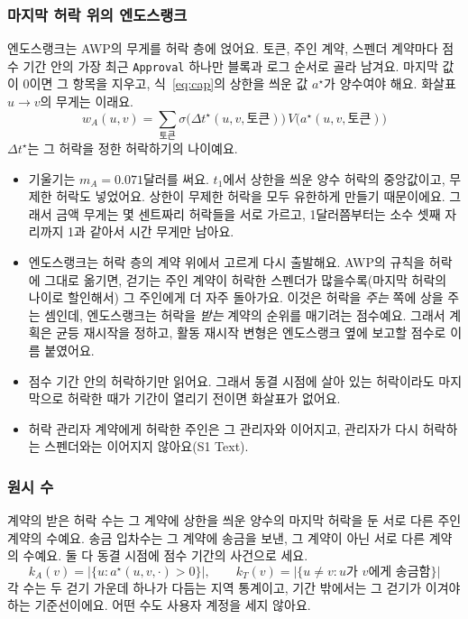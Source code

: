\subsubsection{마지막 허락 위의 엔도스랭크}

엔도스랭크는 AWP의 무게를 허락 층에 얹어요. 토큰, 주인 계약, 스펜더 계약마다 점수 기간 안의 가장 최근 \texttt{Approval} 하나만 블록과 로그 순서로 골라 남겨요. 마지막 값이 0이면 그 항목을 지우고, 식~\eqref{eq:cap}의 상한을 씌운 값 $a^{\star}$가 양수여야 해요. 화살표 $u\to v$의 무게는 이래요.
\begin{equation}
\label{eq:er-weight}
w_A(u,v)=\sum_{\text{토큰}}\sigma\bigl(\Delta t^{\star}(u,v,\text{토큰})\bigr)\,V\bigl(a^{\star}(u,v,\text{토큰})\bigr)
\end{equation}
$\Delta t^{\star}$는 그 허락을 정한 허락하기의 나이예요.
\begin{itemize}
\item 기울기는 $m_A=0.071$달러를 써요. $t_1$에서 상한을 씌운 양수 허락의 중앙값이고, 무제한 허락도 넣었어요. 상한이 무제한 허락을 모두 유한하게 만들기 때문이에요. 그래서 금액 무게는 몇 센트짜리 허락들을 서로 가르고, 1달러쯤부터는 소수 셋째 자리까지 1과 같아서 시간 무게만 남아요.
\item 엔도스랭크는 허락 층의 계약 위에서 고르게 다시 출발해요. AWP의 규칙을 허락에 그대로 옮기면, 걷기는 주인 계약이 허락한 스펜더가 많을수록(마지막 허락의 나이로 할인해서) 그 주인에게 더 자주 돌아가요. 이것은 허락을 \emph{주는} 쪽에 상을 주는 셈인데, 엔도스랭크는 허락을 \emph{받는} 계약의 순위를 매기려는 점수예요. 그래서 계획은 균등 재시작을 정하고, 활동 재시작 변형은 엔도스랭크 옆에 보고할 점수로 이름 붙였어요.
\item 점수 기간 안의 허락하기만 읽어요. 그래서 동결 시점에 살아 있는 허락이라도 마지막으로 허락한 때가 기간이 열리기 전이면 화살표가 없어요.
\item 허락 관리자 계약에게 허락한 주인은 그 관리자와 이어지고, 관리자가 다시 허락하는 스펜더와는 이어지지 않아요(S1 Text).
\end{itemize}

\subsubsection{원시 수}

계약의 받은 허락 수는 그 계약에 상한을 씌운 양수의 마지막 허락을 둔 서로 다른 주인 계약의 수예요. 송금 입차수는 그 계약에 송금을 보낸, 그 계약이 아닌 서로 다른 계약의 수예요. 둘 다 동결 시점에 점수 기간의 사건으로 세요.
\begin{equation}
\label{eq:degrees}
k_A(v)=\bigl|\{u : a^{\star}(u,v,\cdot)>0\}\bigr|,
\qquad
k_T(v)=\bigl|\{u\neq v : u\text{가 } v\text{에게 송금함}\}\bigr|
\end{equation}
각 수는 두 걷기 가운데 하나가 다듬는 지역 통계이고, 기간 밖에서는 그 걷기가 이겨야 하는 기준선이에요. 어떤 수도 사용자 계정을 세지 않아요.

